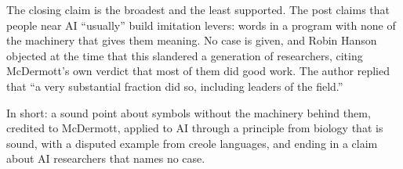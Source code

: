 \begin{afterword}
The closing claim is the broadest and the least supported. The post claims that people near AI ``usually'' build imitation levers: words in a program with none of the machinery that gives them meaning. No case is given, and Robin Hanson objected at the time that this slandered a generation of researchers, citing McDermott's own verdict that most of them did good work. The author replied that ``a very substantial fraction did so, including leaders of the field.''

In short: a sound point about symbols without the machinery behind them, credited to McDermott, applied to AI through a principle from biology that is sound, with a disputed example from creole languages, and ending in a claim about AI researchers that names no case.
\end{afterword}
